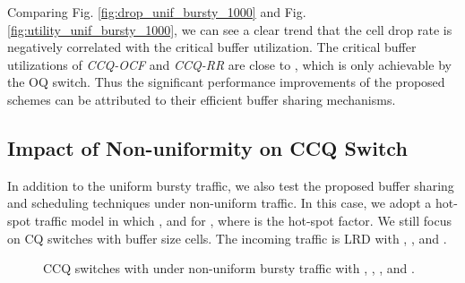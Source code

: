 \documentclass[journal,final,doublecolumn,10pt,twoside]{IEEEtranTCOM} \normalsize
\begin{document}
Comparing Fig. \ref{fig:drop_unif_bursty_1000} and Fig. \ref{fig:utility_unif_bursty_1000}, we can see a clear trend that the cell drop rate is negatively correlated with the critical buffer utilization. The critical buffer utilizations of \emph{CCQ-OCF} and \emph{CCQ-RR} are close to , which is only achievable by the OQ switch. Thus the significant performance improvements of the proposed schemes can be attributed to their efficient buffer sharing mechanisms.



\subsection{Impact of Non-uniformity on CCQ Switch}

In addition to the uniform bursty traffic, we also test the proposed buffer sharing and scheduling techniques under non-uniform traffic. In this case, we adopt a hot-spot traffic model in which , and  for ,
where  is the hot-spot factor.
We still focus on  CQ switches with buffer size  cells. The incoming traffic is LRD with , , and .



\begin{figure}[ht]
\begin{minipage}[t]{3.2 in}
\centering {}
\end{minipage}
\begin{minipage}[t]{3.2 in}
\centering {}
\end{minipage}
\caption{ CCQ switches with  under non-uniform bursty traffic with , , , and .}
\label{fig:nonunif}
\end{figure}
\end{document}
